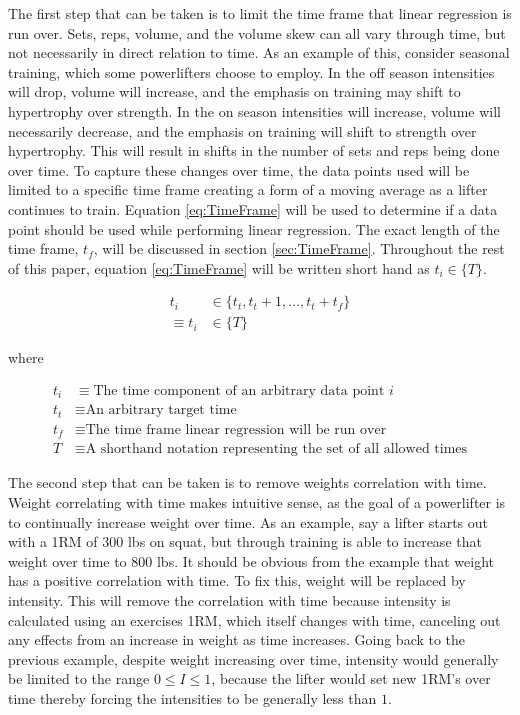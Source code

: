 The first step that can be taken is to limit the time frame that linear regression is run over. Sets, reps, volume, and the volume skew can all vary through time, but not necessarily in direct relation to time. As an example of this, consider seasonal training, which some powerlifters choose to employ. In the off season intensities will drop, volume will increase, and the emphasis on training may shift to hypertrophy over strength. In the on season intensities will increase, volume will necessarily decrease, and the emphasis on training will shift to strength over hypertrophy. This will result in shifts in the number of sets and reps being done over time. To capture these changes over time, the data points used will be limited to a specific time frame creating a form of a moving average as a lifter continues to train. Equation \ref{eq:TimeFrame} will be used to determine if a data point should be used while performing linear regression. The exact length of the time frame, $t_f$, will be discussed in section \ref{sec:TimeFrame}. Throughout the rest of this paper, equation \ref{eq:TimeFrame} will be written short hand as $t_i\in \{ T \}$.

\begin{equation}
    \label{eq:TimeFrame}
    \begin{split}
        t_i & \in\{ t_t, t_t+1,\dots,t_t+t_f \} \\
        \equiv t_i & \in \{ T \}
    \end{split}
\end{equation}
\centerline{where}
\begin{equation*}
    \begin{split}
        t_i &\equiv \text{The time component of an arbitrary data point }i \\
        t_t &\equiv \text{An arbitrary target time} \\
        t_f &\equiv \text{The time frame linear regression will be run over} \\
        T & \equiv \text{A shorthand notation representing the set of all allowed times}
    \end{split}
\end{equation*}

The second step that can be taken is to remove weights correlation with time. Weight correlating with time makes intuitive sense, as the goal of a powerlifter is to continually increase weight over time. As an example, say a lifter starts out with a 1RM of $300$ lbs on squat, but through training is able to increase that weight over time to $800$ lbs. It should be obvious from the example that weight has a positive correlation with time. To fix this, weight will be replaced by intensity. This will remove the correlation with time because intensity is calculated using an exercises 1RM, which itself changes with time, canceling out any effects from an increase in weight as time increases. Going back to the previous example, despite weight increasing over time, intensity would generally be limited to the range $0\le I\le 1$, because the lifter would set new 1RM's over time thereby forcing the intensities to be generally less than $1$.

